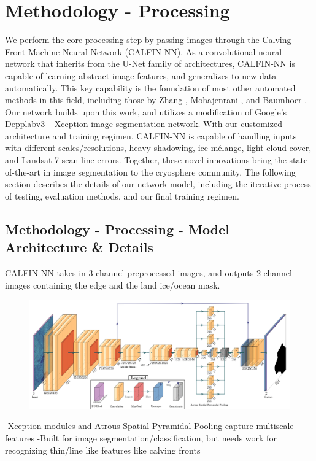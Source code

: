 \documentclass[tc, manuscript]{copernicus}
\begin{document}
\section{Methodology - Processing}
We perform the core processing step by passing images through the Calving Front Machine Neural Network (CALFIN-NN). As a convolutional neural network that inherits from the U-Net family of architectures, CALFIN-NN is capable of learning abstract image features, and generalizes to new data automatically. This key capability is the foundation of most other automated methods in this field, including those by Zhang \cite{zhang-tc}, Mohajenrani \cite{mohajerani-rs}, and Baumhoer \cite{baumhoer}. Our network builds upon this work, and utilizes a modification of Google's Depplabv3+ Xception image segmentation network. With our customized architecture and training regimen, CALFIN-NN is capable of handling inputs with different scales/resolutions, heavy shadowing, ice mélange, light cloud cover, and Landsat 7 scan-line errors. Together, these novel innovations bring the  state-of-the-art in image segmentation to the cryosphere community. The following section describes the details of our network model, including the iterative process of testing, evaluation methods, and our final training regimen.

\subsection{Methodology - Processing - Model Architecture \& Details}
CALFIN-NN takes in 3-channel preprocessed images, and outputs 2-channel images containing the edge and the land ice/ocean mask. 


\begin{figure}[t]
\includegraphics[width=18cm]{arch_final.png}
\centering
\end{figure}

-Xception modules and Atrous Spatial Pyramidal Pooling capture multiscale features
-Built for image segmentation/classification, but needs work for recognizing thin/line like features like calving fronts
\end{document}
